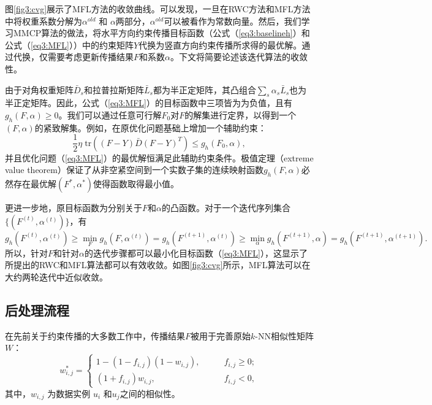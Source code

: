 图\ref{fig3:cvg}展示了MFL方法的收敛曲线。可以发现，一旦在RWC方法和MFL方法中将权重系数分解为$ {\alpha}^{old} $ 和 $ {\alpha} $两部分，$ {\alpha}^{old} $可以被看作为常数向量。然后，我们学习MMCP算法的做法，将水平方向约束传播目标函数（公式（\ref{eq3:baselineh}）和公式（\ref{eq3:MFL}））中的约束矩阵$Y$代换为竖直方向约束传播所求得的最优解。通过代换，仅需要考虑更新传播结果$F$和系数$\alpha$。下文将简要论述该迭代算法的收敛性。

由于对角权重矩阵$ \bar{{D}}_s $和拉普拉斯矩阵$\bar{L}_s$都为半正定矩阵，其凸组合$ \sum_s\alpha_s\bar{{L}}_s $也为半正定矩阵。因此，公式（\ref{eq3:MFL}）的目标函数中三项皆为为负值，且有$ g_h({F}, {\alpha}) \ge 0 $。我们可以通过任意可行解$F_0$对$F$的解集进行定界，以得到一个$(F, \alpha)$的紧致解集。例如，在原优化问题基础上增加一个辅助约束：
\begin{equation}
        \frac{1}{2}\eta\;\mathrm{tr}(({F}-{Y})\bar{{D}}({F}-{Y})^T)  \le g_h({F}_0, {\alpha}),
\end{equation}
并且优化问题（\ref{eq3:MFL}）的最优解恒满足此辅助约束条件。极值定理（extreme value theorem）保证了从非空紧空间到一个实数子集的连续映射函数$ g_h({F}, {\alpha})$必然存在最优解$({F}^*, {\alpha}^*) $使得函数取得最小值。

更进一步地，原目标函数为分别关于$F$和$\alpha$的凸函数。对于一个迭代序列集合$ \{({F}^{(t)}, {\alpha}^{(t)})\} $，有
\begin{equation}
    g_h({F}^{(t)}, {\alpha}^{(t)}) \ge \mathop{\mathrm{min}}_{{F}} g_h({F}, {\alpha}^{(t)}) = g_h({F}^{(t+1)}, {\alpha}^{(t)}) \ge \mathop{\mathrm{min}}_ {{\alpha}} g_h({F}^{(t+1)}, {\alpha}) =g_h({F}^{(t+1)}, {\alpha}^{(t+1)}).
\end{equation}
所以，针对$F$和针对$\alpha$的迭代步骤都可以最小化目标函数（\ref{eq3:MFL}），这显示了所提出的RWC和MFL算法都可以有效收敛。如图\ref{fig3:cvg}所示，MFL算法可以在大约两轮迭代中近似收敛。

\subsection{后处理流程}
在先前关于约束传播的大多数工作中，传播结果$F$被用于完善原始$k$-NN相似性矩阵$W$：
\begin{equation}
w^*_{i,j} = 
\begin{cases}
1-(1-f_{i,j})(1-w_{i,j}), \qquad &f_{i,j}\ge 0;\\
(1+f_{i,j})w_{i,j}, &f_{i,j}< 0,
\end{cases}
\label{eq3:refine}
\end{equation}
其中，$ w_{i,j} $ 为数据实例 $ u_i $ 和$ u_j $之间的相似性。

